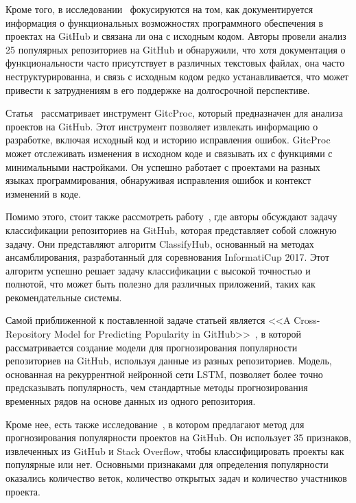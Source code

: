 Кроме того, в исследовании~\cite{PuhlfurssMM22} фокусируются на том, как документируется информация о функциональных возможностях программного обеспечения в проектах на GitHub и связана ли она с исходным кодом. Авторы провели анализ 25 популярных репозиториев на GitHub и обнаружили, что хотя документация о функциональности часто присутствует в различных текстовых файлах, она часто неструктурированна, и связь с исходным кодом редко устанавливается, что может привести к затруднениям в его поддержке на долгосрочной перспективе. 

Статья~\cite{CasalnuovoSRR17} рассматривает инструмент GitcProc, который предназначен для анализа проектов на GitHub. Этот инструмент позволяет извлекать информацию о разработке, включая исходный код и историю исправления ошибок. GitcProc может отслеживать изменения в исходном коде и связывать их с функциями с минимальными настройками. Он успешно работает с проектами на разных языках программирования, обнаруживая исправления ошибок и контекст изменений в коде. 

Помимо этого, стоит также рассмотреть работу~\cite{SollV17}, где авторы обсуждают задачу классификации репозиториев на GitHub, которая представляет собой сложную задачу. Они представляют алгоритм ClassifyHub, основанный на методах ансамблирования, разработанный для соревнования InformatiCup 2017. Этот алгоритм успешно решает задачу классификации с высокой точностью и полнотой, что может быть полезно для различных приложений, таких как рекомендательные системы.

Самой приближенной к поставленной задаче статьей является <<A Cross-Repository Model for Predicting Popularity in GitHub>>~\cite{abs-1902-05216}, в которой рассматривается создание модели для прогнозирования популярности репозиториев на GitHub, используя данные из разных репозиториев. Модель, основанная на рекуррентной нейронной сети LSTM, позволяет более точно предсказывать популярность, чем стандартные методы прогнозирования временных рядов на основе данных из одного репозитория. 

Кроме нее, есть также исследование~\cite{HanDXWY19}, в котором предлагают метод для прогнозирования популярности проектов на GitHub. Он использует 35 признаков, извлеченных из GitHub и Stack Overflow, чтобы классифицировать проекты как популярные или нет. Основными признаками для определения популярности оказались количество веток, количество открытых задач и количество участников проекта.
\vspace{1em}

